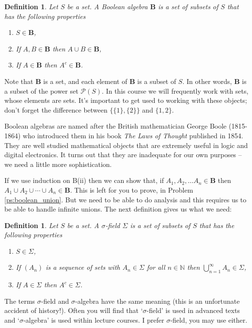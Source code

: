 \documentclass[a4paper]{report}
\newcounter{thm_counter}[chapter]
\newtheorem{defn}[thm_counter]{Definition}
\numberwithin{equation}{chapter}
\numberwithin{thm_counter}{section}
\newcommand{\nN}{n \in \mathbb{N}}
\def\mc{\mathcal} %
\begin{document}
 

\begin{defn}
Let $S$ be a set. A {\it Boolean algebra} ${\mathbf B}$ is a set of subsets of $S$ that has the following properties
\begin{enumerate}
\item[B(i)] $S \in {\mathbf B}$,
\item[B(ii)] If $A,B \in {\mathbf B}$ then $A \cup B \in {\mathbf B}$,
\item[B(iii)] If $A \in {\mathbf B}$ then $A^{c} \in {\mathbf B}$.
\end{enumerate}
\end{defn}
Note that $\mathbf{B}$ is a set, and each element of $\mathbf{B}$ is a subset of $S$. In other words, $\mathbf{B}$ is a subset of the power set $\mc{P}(S)$.
In this course we will frequently work with sets, whose elements are sets. It's important to get used to working with these objects; don't forget the difference between $\{\{1\},\{2\}\}$ and $\{1,2\}$.


Boolean algebras are named after the British mathematician George Boole (1815-1864) who introduced them in his book {\it The Laws of Thought} published in 1854. They are well studied mathematical objects that are extremely useful in logic and digital electronics. It turns out that they are inadequate for our own purposes -- we need a little more sophistication.

If we use induction on B(ii) then we can show that, if $A_{1}, A_{2}, \ldots A_{n} \in {\mathbf B}$ then $A_{1} \cup A_{2} \cup \cdots \cup  A_{n} \in {\mathbf B}$. This is left for you to prove, in Problem \ref{ps:boolean_union}. But we need to be able to do analysis and this requires us to be able to handle infinite unions. The next definition gives us what we need:


\begin{defn} Let $S$ be a set. 
A $\sigma$-field $\Sigma$ is a set of subsets of $S$ that has the following properties
\begin{enumerate}
\item[S(i)] $S \in \Sigma$,
\item[S(ii)] If $(A_{n})$ is a sequence of sets with $A_{n} \in \Sigma$ for all $\nN$ then $\bigcup_{n=1}^{\infty}A_{n} \in \Sigma$,
\item[S(iii)] If $A \in \Sigma$ then $A^{c} \in \Sigma$.
\end{enumerate}
\end{defn}

The terms $\sigma$-field and $\sigma$-algebra have the same meaning (this is an unfortunate accident of history!). Often you will find that `$\sigma$-field' is used in advanced texts and `$\sigma$-algebra' is used within lecture courses. I prefer $\sigma$-field, you may use either.
\end{document}
